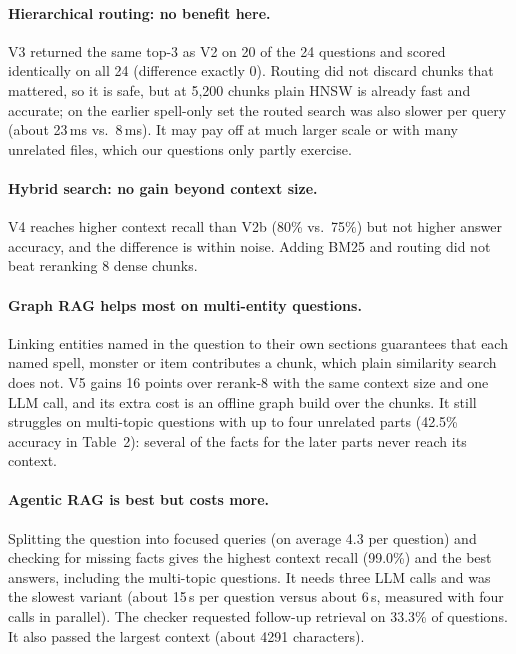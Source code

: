 \documentclass[11pt,a4paper]{article}
\begin{document}
\paragraph{Hierarchical routing: no benefit here.} V3 returned the same top-3 as V2 on 20 of the 24 questions and scored identically on all 24 (difference exactly 0). Routing did not discard chunks that mattered, so it is safe, but at 5{,}200 chunks plain HNSW is already fast and accurate; on the earlier spell-only set the routed search was also slower per query (about 23\,ms vs.\ 8\,ms). It may pay off at much larger scale or with many unrelated files, which our questions only partly exercise.

\paragraph{Hybrid search: no gain beyond context size.} V4 reaches higher context recall than V2b (80\% vs.\ 75\%) but not higher answer accuracy, and the difference is within noise. Adding BM25 and routing did not beat reranking 8 dense chunks.

\paragraph{Graph RAG helps most on multi-entity questions.} Linking entities named in the question to their own sections guarantees that each named spell, monster or item contributes a chunk, which plain similarity search does not. V5 gains 16 points over rerank-8 with the same context size and one LLM call, and its extra cost is an offline graph build over the chunks. It still struggles on multi-topic questions with up to four unrelated parts (42.5\% accuracy in Table~2): several of the facts for the later parts never reach its context.

\paragraph{Agentic RAG is best but costs more.} Splitting the question into focused queries (on average 4.3 per question) and checking for missing facts gives the highest context recall (99.0\%) and the best answers, including the multi-topic questions. It needs three LLM calls and was the slowest variant (about 15\,s per question versus about 6\,s, measured with four calls in parallel). The checker requested follow-up retrieval on 33.3\% of questions. It also passed the largest context (about 4291 characters).
\end{document}
